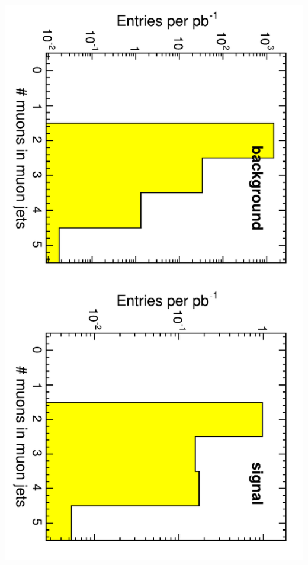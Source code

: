 \documentclass[compress]{beamer}
\begin{document}
\begin{frame}
\begin{columns}
\includegraphics[height=\linewidth, angle=90]{backgrounds_muonsperjet.pdf}
\end{columns}
\end{frame}
\end{document}
